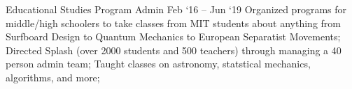 \experience
    {Educational Studies Program}
    {Admin}
    {Feb `16 -- Jun `19}
    {
        Organized programs for middle/high schoolers to take classes from MIT students about
        anything from Surfboard Design to Quantum Mechanics to European Separatist Movements;
        Directed Splash (over 2000 students and 500 teachers) through managing a 40 person admin
        team;
        Taught classes on astronomy, statstical mechanics, algorithms, and more;
    }
